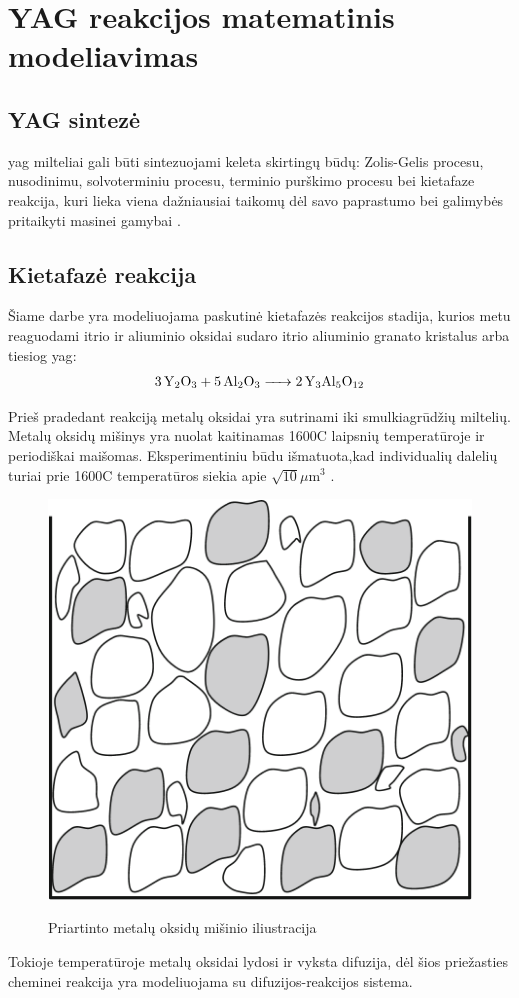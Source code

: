 
\section{YAG reakcijos matematinis modeliavimas}

\subsection{YAG sintezė}

\acs{yag} milteliai gali būti sintezuojami keleta skirtingų būdų: Zolis-Gelis procesu, nusodinimu, solvoterminiu procesu, terminio purškimo procesu bei kietafaze reakcija, kuri lieka viena dažniausiai taikomų dėl savo paprastumo bei galimybės pritaikyti masinei gamybai \cite{zhangNovelSynthesisYAG2005}.

\subsection{Kietafazė reakcija}

Šiame darbe yra modeliuojama paskutinė kietafazės reakcijos stadija, kurios metu reaguodami itrio ir aliuminio oksidai sudaro itrio aliuminio granato kristalus arba tiesiog \acs{yag}:
\begin{align*}
  \ce{3Y_2O_3 + 5Al_2O_3 -> 2Y_3Al_5O_12}
\end{align*}

Prieš pradedant reakciją metalų oksidai yra sutrinami iki smulkiagrūdžių miltelių. Metalų oksidų mišinys yra nuolat kaitinamas 1600\degree C laipsnių temperatūroje ir periodiškai maišomas. Eksperimentiniu būdu išmatuota,kad individualių dalelių turiai prie 1600\degree C temperatūros siekia apie $\sqrt{10}\mu\text{m}^3$ \cite{ivanauskasComputationalModellingYAG2009}.

\begin{figure}[h]
  \centering
  \includegraphics[width=0.25\linewidth]{assets/metal_oxides_mixture.png}
  \label{fig:metal-oxides-mixuter}
  \caption{Priartinto metalų oksidų mišinio iliustracija}
\end{figure}

Tokioje temperatūroje metalų oksidai lydosi ir vyksta difuzija, dėl šios priežasties cheminei reakcija yra modeliuojama su difuzijos-reakcijos sistema.
